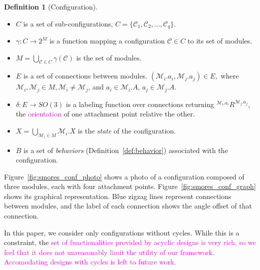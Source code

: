 \documentclass[conference]{IEEEtran}
\theoremstyle{definition}
\newtheorem{definition}{Definition}[section]
\newcommand{\abt}[1]{\textcolor{magenta}{#1}}
\begin{document}
\begin{definition}[Configuration]
\begin{itemize}
\item $C$ is a set of sub-configurations, $C=\{\mathcal{C}_{1}, \mathcal{C}_{2}, ..., \mathcal{C}_{q}\}$.
\item $\gamma: C \rightarrow 2^M$ is a function {mapping} a configuration \( \mathcal{C}
\in C\) to its set
of modules.
\item \( M=\bigcup_{\mathcal{C}\in C}{\gamma(\mathcal{C})} \) is the set of modules.
\item $E$ is a set of connections between modules. $(\mathcal{M}_i.a_i, \mathcal{M}_j.a_j)\in E,$ where $\mathcal{M}_{i},\mathcal{M}_j \in M, \mathcal{M}_i \neq \mathcal{M}_j$, and $a_i\in \mathcal{M}_i.A$, $a_j\in \mathcal{M}_j.A$.
\item $\delta: E \rightarrow SO(3)$ is a labeling function over connections returning
\({^{\mathcal{M}_i.a_i}}R^{\mathcal{M}_j.a_j}\), the \abt{orientation} of one attachment point relative the
other. \item \(X = \displaystyle\bigcup_{\mathcal{M}_i \in M} \mathcal{M}_i.X \) is the \textit{state} of the configuration.
\item \(B\) is a set of \textit{behaviors} (Definition~\ref{def:behavior}) associated with the configuration.
\end{itemize}

Figure~\ref{fig:smores_conf_photo} shows a photo of a configuration composed
of three modules, each with four attachment points.  Figure~\ref{fig:smores_conf_graph} shows its
graphical representation. Blue zigzag lines represent connections between
modules, and the label of each connection shows the angle offset of that
connection.

In this paper, we consider only configurations without cycles. While this is a constraint,
the \abt{set of functionalities provided by acyclic designs is very rich, so we feel that
it does not unreasonably limit the utility of our framework. Accomodating designs
with cycles is left to future work.}


\end{definition}
\end{document}
